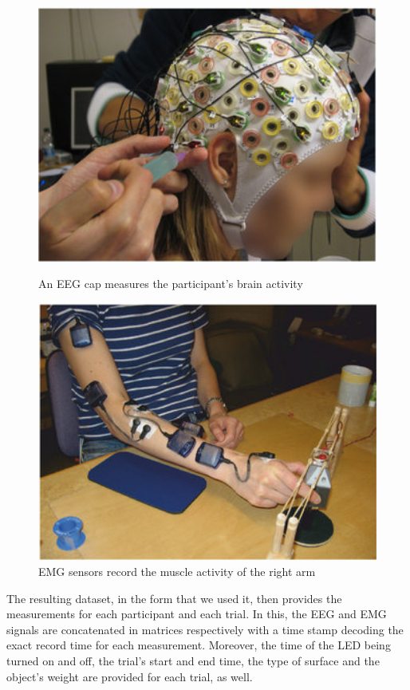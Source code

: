 \documentclass{article} %
\begin{document}
\begin{figure}
	\centering
	\begin{minipage}{0.5\textwidth}
		\centering
		\includegraphics[width=1.0\textwidth]{images/eeg_setup.jpg}
		\caption{An EEG cap measures the participant's brain activity \citep{nature}}
		\label{fig:eeg_setup}
	\end{minipage}\hfill
	\begin{minipage}{0.49\textwidth}
		\centering
		\includegraphics[width=1.0\textwidth]{images/emg_setup.jpg}
		\caption{EMG sensors record the muscle activity of the right arm \citep{nature}}
		\label{fig:emg_setup}
	\end{minipage}
\end{figure}
The resulting dataset, in the form that we used it, then provides the measurements for each participant and each trial. In this, the EEG and EMG signals are concatenated in matrices respectively with a time stamp decoding the exact record time for each measurement. Moreover, the time of the LED being turned on and off, the trial's start and end time, the type of surface and the object's weight are provided for each trial, as well. \citep{nature}
\end{document}
